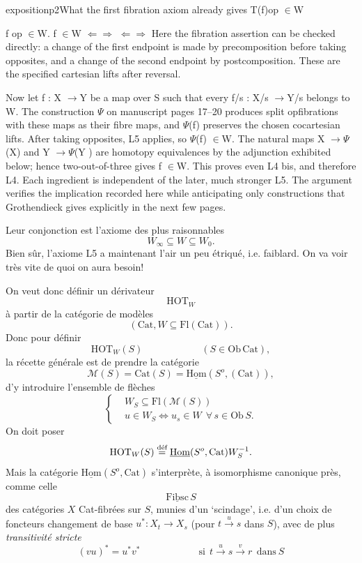 \begin{dcomment}{exposition}{p2}{What the first fibration axiom already gives}
T(f)op \ensuremath{\in}W

f op \ensuremath{\in}W. f \ensuremath{\in}W \ensuremath{\Leftarrow}\ensuremath{\Rightarrow} \ensuremath{\Leftarrow}\ensuremath{\Rightarrow} Here the fibration assertion can be checked directly: a change of the first endpoint is made by precomposition before taking opposites, and a change of the second endpoint by postcomposition. These are the specified cartesian lifts after reversal.

Now let f : X \ensuremath{\to}Y be a map over S such that every f/s : X/s \ensuremath{\to}Y/s belongs to W. The construction \ensuremath{\Psi} on manuscript pages 17--20 produces split opfibrations with these maps as their fibre maps, and \ensuremath{\Psi}(f) preserves the chosen cocartesian lifts. After taking opposites, L5 applies, so \ensuremath{\Psi}(f) \ensuremath{\in}W. The natural maps X \ensuremath{\to}\ensuremath{\Psi}(X) and Y \ensuremath{\to}\ensuremath{\Psi}(Y ) are homotopy equivalences by the adjunction exhibited below; hence two-out-of-three gives f \ensuremath{\in}W. This proves even L4 bis, and therefore L4. Each ingredient is independent of the later, much stronger L5. The argument verifies the implication recorded here while anticipating only constructions that Grothendieck gives explicitly in the next few pages.

\end{dcomment}


\noindent Leur conjonction est l'axiome des plus raisonnables
\[
W_\infty \subseteq W \subseteq W_0.
\]
Bien sûr, l'axiome L5 a maintenant l'air un peu étriqué, i.e. faiblard. On va voir très vite de quoi on aura besoin!

\noindent On veut donc définir un dérivateur
\[
\mathrm{HOT}_W
\]
à partir de la catégorie de modèles
\[
(\mathrm{Cat}, W \subseteq \mathrm{Fl}(\mathrm{Cat})).
\]
Donc pour définir
\[
\mathrm{HOT}_W(S) \qquad\qquad\qquad (S \in \mathrm{Ob}\,\mathrm{Cat}),
\]
la récette générale est de prendre la catégorie %
\[
\mathcal{M}(S) = \mathrm{Cat}(S) = \underline{\mathrm{Hom}}(S^o, (\mathrm{Cat})),
\]
d'y introduire l'ensemble de flèches
\[
\left\{
\begin{aligned}
& W_S \subseteq \mathrm{Fl}(\mathcal{M}(S)) \\
& u \in W_S \Longleftrightarrow u_s \in W \ \ \forall\, s \in \mathrm{Ob}\,S.
\end{aligned}
\right.
\]
On doit poser
\[
\mathrm{HOT}_W(S) \deq \underline{\mathrm{Hom}}(S^o, \mathrm{Cat})W_S^{-1}.
\]
Mais la catégorie $\underline{\mathrm{Hom}}(S^o, \mathrm{Cat})$ s'interprète, à isomorphisme canonique près, comme celle
\[
\underline{\mathrm{Fibsc}}\,S
\]
des catégories $X$ Cat-fibrées sur $S$, munies d'un `scindage', i.e. d'un choix de foncteurs changement de base $u^* : X_t \longrightarrow X_s$ (pour $t \xrightarrow{u} s$ dans $S$), avec de plus \textit{transitivité stricte}
\[
(vu)^* = u^* v^* \qquad\qquad\qquad \text{si}\ \ t \xrightarrow{u} s \xrightarrow{v} r\ \ \text{dans}\ S
\]

